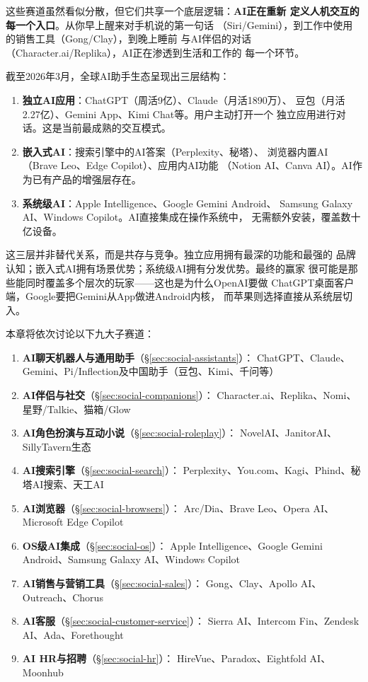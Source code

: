 这些赛道虽然看似分散，但它们共享一个底层逻辑：\textbf{AI正在重新
定义人机交互的每一个入口}。从你早上醒来对手机说的第一句话
（Siri/Gemini），到工作中使用的销售工具（Gong/Clay），到晚上睡前
与AI伴侣的对话（Character.ai/Replika），AI正在渗透到生活和工作的
每一个环节。

\begin{corebox}
截至2026年3月，全球AI助手生态呈现出三层结构：
\begin{enumerate}
  \item \textbf{独立AI应用}：ChatGPT（周活9亿）、Claude（月活1890万）、
    豆包（月活2.27亿）、Gemini App、Kimi Chat等。用户主动打开一个
    独立应用进行对话。这是当前最成熟的交互模式。
  \item \textbf{嵌入式AI}：搜索引擎中的AI答案（Perplexity、秘塔）、
    浏览器内置AI（Brave Leo、Edge Copilot）、应用内AI功能
    （Notion AI、Canva AI）。AI作为已有产品的增强层存在。
  \item \textbf{系统级AI}：Apple Intelligence、Google Gemini Android、
    Samsung Galaxy AI、Windows Copilot。AI直接集成在操作系统中，
    无需额外安装，覆盖数十亿设备。
\end{enumerate}
这三层并非替代关系，而是共存与竞争。独立应用拥有最深的功能和最强的
品牌认知；嵌入式AI拥有场景优势；系统级AI拥有分发优势。最终的赢家
很可能是那些能同时覆盖多个层次的玩家——这也是为什么OpenAI要做
ChatGPT桌面客户端，Google要把Gemini从App做进Android内核，
而苹果则选择直接从系统层切入。
\end{corebox}

本章将依次讨论以下九大子赛道：

\begin{enumerate}
  \item \textbf{AI聊天机器人与通用助手}（\S\ref{sec:social-assistants}）：
    ChatGPT、Claude、Gemini、Pi/Inflection及中国助手（豆包、Kimi、千问等）
  \item \textbf{AI伴侣与社交}（\S\ref{sec:social-companions}）：
    Character.ai、Replika、Nomi、星野/Talkie、猫箱/Glow
  \item \textbf{AI角色扮演与互动小说}（\S\ref{sec:social-roleplay}）：
    NovelAI、JanitorAI、SillyTavern生态
  \item \textbf{AI搜索引擎}（\S\ref{sec:social-search}）：
    Perplexity、You.com、Kagi、Phind、秘塔AI搜索、天工AI
  \item \textbf{AI浏览器}（\S\ref{sec:social-browsers}）：
    Arc/Dia、Brave Leo、Opera AI、Microsoft Edge Copilot
  \item \textbf{OS级AI集成}（\S\ref{sec:social-os}）：
    Apple Intelligence、Google Gemini Android、Samsung Galaxy AI、Windows Copilot
  \item \textbf{AI销售与营销工具}（\S\ref{sec:social-sales}）：
    Gong、Clay、Apollo AI、Outreach、Chorus
  \item \textbf{AI客服}（\S\ref{sec:social-customer-service}）：
    Sierra AI、Intercom Fin、Zendesk AI、Ada、Forethought
  \item \textbf{AI HR与招聘}（\S\ref{sec:social-hr}）：
    HireVue、Paradox、Eightfold AI、Moonhub
\end{enumerate}

